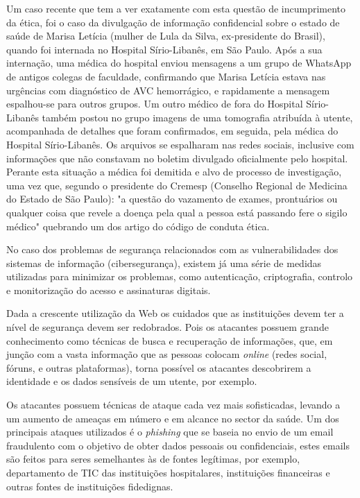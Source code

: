 \documentclass[conference]{IEEEtran}
\begin{document}
Um caso recente que tem a ver exatamente com esta questão de incumprimento da ética, foi o caso da divulgação de informação confidencial sobre o estado de saúde de Marisa Letícia (mulher de Lula da Silva, ex-presidente do Brasil), quando foi internada no Hospital Sírio-Libanês, em São Paulo. Após a sua internação, uma médica do hospital enviou mensagens a um grupo de WhatsApp de antigos colegas de faculdade, confirmando que Marisa Letícia estava nas urgências com diagnóstico de AVC hemorrágico, e rapidamente a mensagem espalhou-se para outros grupos. Um outro médico de fora do Hospital Sírio-Libanês também postou no grupo imagens de uma tomografia atribuída à utente, acompanhada de detalhes que foram confirmados, em seguida, pela médica do Hospital Sírio-Libanês. Os arquivos se espalharam nas redes sociais, inclusive com informações que não constavam no boletim divulgado oficialmente pelo hospital. Perante esta situação a médica foi demitida e alvo de processo de investigação, uma vez que, segundo o presidente do Cremesp (Conselho Regional de Medicina do Estado de São Paulo): "a questão do vazamento de exames, prontuários ou qualquer coisa que revele a doença pela qual a pessoa está passando fere o sigilo médico" quebrando um dos artigo do código de conduta ética.

No caso dos problemas de segurança relacionados com as vulnerabilidades dos sistemas de informação (cibersegurança), existem já uma série de medidas utilizadas para minimizar os problemas, como autenticação, criptografia, controlo e monitorização do acesso e assinaturas digitais. 

Dada a crescente utilização da Web os cuidados que as instituições devem ter a nível de segurança devem ser redobrados. Pois os atacantes possuem grande conhecimento como técnicas de busca e recuperação de informações, que, em junção com a vasta informação que as pessoas colocam \textit{online} (redes social, fóruns, e outras plataformas), torna possível os atacantes descobrirem a identidade e os dados sensíveis de um utente, por exemplo.

Os atacantes possuem técnicas de ataque cada vez mais sofisticadas, levando a um aumento de ameaças em número e em alcance no sector da saúde. Um dos principais ataques utilizados é o \textit{phishing} que se baseia no envio de um email fraudulento com o objetivo de obter dados pessoais ou confidenciais, estes emails são feitos para seres semelhantes às de fontes legítimas, por exemplo, departamento de TIC das instituições hospitalares, instituições financeiras e outras fontes de instituições fidedignas.
\end{document}
